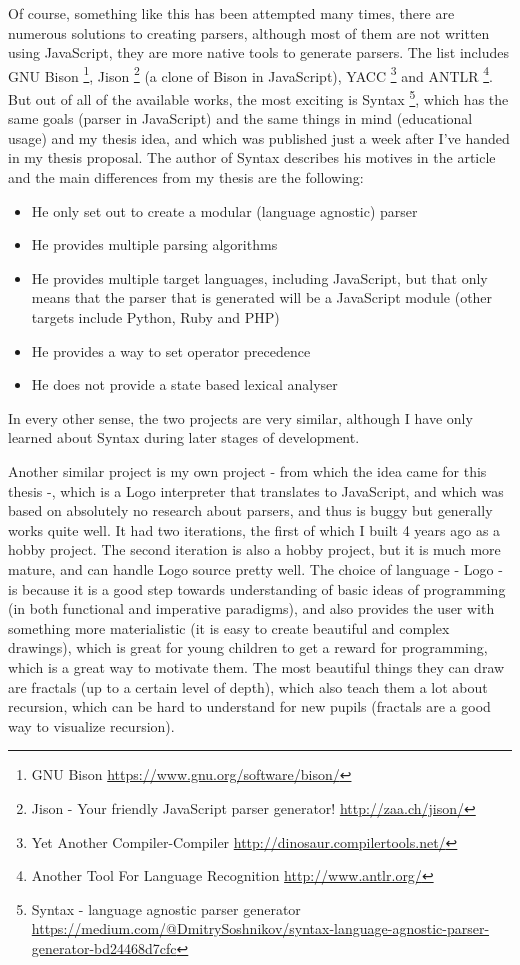 Of course, something like this has been attempted many times, there are numerous solutions to creating parsers, although most of them are not written using JavaScript, they are more native tools to generate parsers. The list includes GNU Bison \footnote{GNU Bison \url{https://www.gnu.org/software/bison/}}, Jison \footnote{Jison - Your friendly JavaScript parser generator! \url{http://zaa.ch/jison/}} (a clone of Bison in JavaScript), YACC \footnote{Yet Another Compiler-Compiler \url{http://dinosaur.compilertools.net/}} and ANTLR \footnote{Another Tool For Language Recognition \url{http://www.antlr.org/}}. But out of all of the available works, the most exciting is Syntax \footnote{Syntax - language agnostic parser generator \url{https://medium.com/@DmitrySoshnikov/syntax-language-agnostic-parser-generator-bd24468d7cfc}}, which has the same goals (parser in JavaScript) and the same things in mind (educational usage) and my thesis idea, and which was published just a week after I've handed in my thesis proposal. The author of Syntax describes his motives in the article and the main differences from my thesis are the following:
\begin{itemize}
\item He only set out to create a modular (language agnostic) parser
\item He provides multiple parsing algorithms
\item He provides multiple target languages, including JavaScript, but that only means that the parser that is generated will be a JavaScript module (other targets include Python, Ruby and PHP)
\item He provides a way to set operator precedence
\item He does not provide a state based lexical analyser
\end{itemize}
In every other sense, the two projects are very similar, although I have only learned about Syntax during later stages of development.

Another similar project is my own project - from which the idea came for this thesis -, which is a Logo interpreter that translates to JavaScript, and which was based on absolutely no research about parsers, and thus is buggy but generally works quite well. It had two iterations, the first of which I built 4 years ago as a hobby project. The second iteration is also a hobby project, but it is much more mature, and can handle Logo source pretty well. The choice of language - Logo - is because it is a good step towards understanding of basic ideas of programming (in both functional and imperative paradigms), and also provides the user with something more materialistic (it is easy to create beautiful and complex drawings), which is great for young children to get a reward for programming, which is a great way to motivate them. The most beautiful things they can draw are fractals (up to a certain level of depth), which also teach them a lot about recursion, which can be hard to understand for new pupils (fractals are a good way to visualize recursion).

